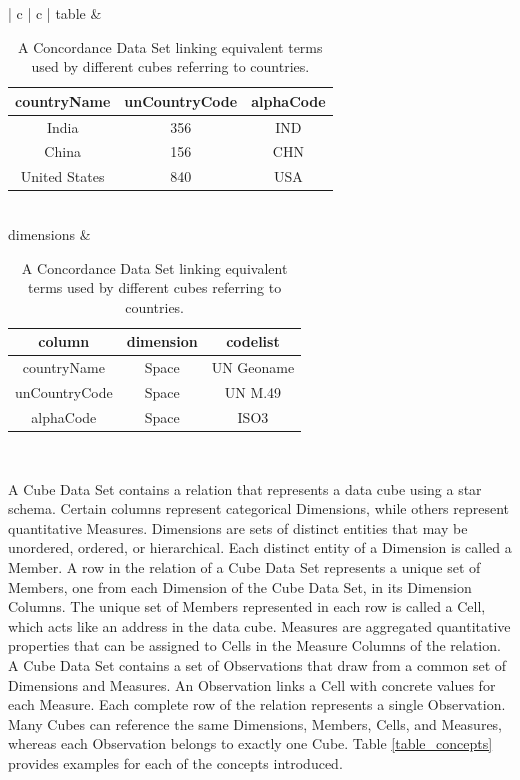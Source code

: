 \begin{table}
  \caption{A Concordance Data Set linking equivalent terms used by different cubes referring to countries.}
  \centering
  \label{table_concordance}
  \begin{tabular}{ | c | c | }
    \hline
    table & 
    \begin{tabular}{ | c | c | c | }
      \hline
      \textbf{countryName} & \textbf{unCountryCode}& \textbf{alphaCode} \\ \hline
      India & 356 & IND \\ \hline
      China & 156 & CHN \\ \hline
      United States & 840 & USA \\ \hline
    \end{tabular}
    \\ \hline
    dimensions &
    \begin{tabular}{ | c | c | c |}
      \hline
      \textbf{column} & \textbf{dimension} & \textbf{codelist} \\ \hline
      countryName & Space & UN Geoname \\ \hline
      unCountryCode & Space & UN M.49 \\ \hline
      alphaCode & Space & ISO3 \\ \hline
    \end{tabular}
    \\ \hline
  \end{tabular}
\end{table}

A Cube Data Set contains a relation that represents a data cube using a star schema. Certain columns represent categorical Dimensions, while others represent quantitative Measures. Dimensions are sets of distinct entities that may be unordered, ordered, or hierarchical. Each distinct entity of a Dimension is called a Member. A row in the relation of a Cube Data Set represents a unique set of Members, one from each Dimension of the Cube Data Set, in its Dimension Columns. The unique set of Members represented in each row is called a Cell, which acts like an address in the data cube. Measures are aggregated quantitative properties that can be assigned to Cells in the Measure Columns of the relation. A Cube Data Set contains a set of Observations that draw from a common set of Dimensions and Measures. An Observation links a Cell with concrete values for each Measure. Each complete row of the relation represents a single Observation. Many Cubes can reference the same Dimensions, Members, Cells, and Measures, whereas each Observation belongs to exactly one Cube. Table \ref{table_concepts} provides examples for each of the concepts introduced.

